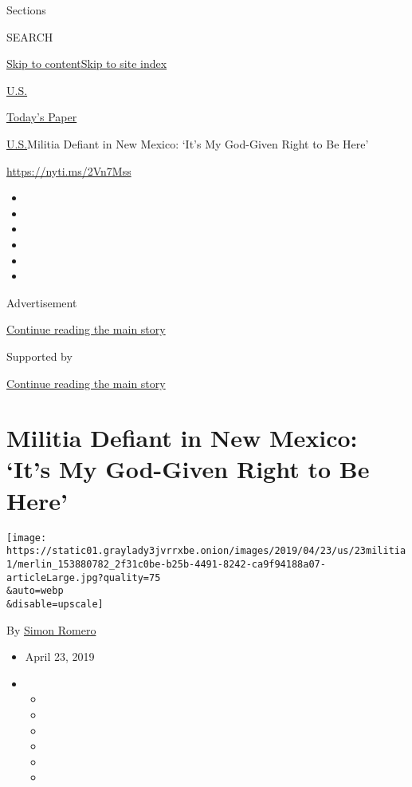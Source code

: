 Sections

SEARCH

\protect\hyperlink{site-content}{Skip to
content}\protect\hyperlink{site-index}{Skip to site index}

\href{https://www.nytimes3xbfgragh.onion/section/us}{U.S.}

\href{https://myaccount.nytimes3xbfgragh.onion/auth/login?response_type=cookie\&client_id=vi}{}

\href{https://www.nytimes3xbfgragh.onion/section/todayspaper}{Today's
Paper}

\href{/section/us}{U.S.}\textbar{}Militia Defiant in New Mexico: `It's
My God-Given Right to Be Here'

\url{https://nyti.ms/2Vn7Mss}

\begin{itemize}
\item
\item
\item
\item
\item
\item
\end{itemize}

Advertisement

\protect\hyperlink{after-top}{Continue reading the main story}

Supported by

\protect\hyperlink{after-sponsor}{Continue reading the main story}

\hypertarget{militia-defiant-in-new-mexico-its-my-god-given-right-to-be-here}{%
\section{Militia Defiant in New Mexico: `It's My God-Given Right to Be
Here'}\label{militia-defiant-in-new-mexico-its-my-god-given-right-to-be-here}}

\texttt{[image: https://static01.graylady3jvrrxbe.onion/images/2019/04/23/us/23militia1/merlin\_153880782\_2f31c0be-b25b-4491-8242-ca9f94188a07-articleLarge.jpg?quality=75\\\&auto=webp\\\&disable=upscale]}

By \href{https://www.nytimes3xbfgragh.onion/by/simon-romero}{Simon
Romero}

\begin{itemize}
\item
  April 23, 2019
\item
  \begin{itemize}
  \item
  \item
  \item
  \item
  \item
  \item
  \end{itemize}
\end{itemize}

